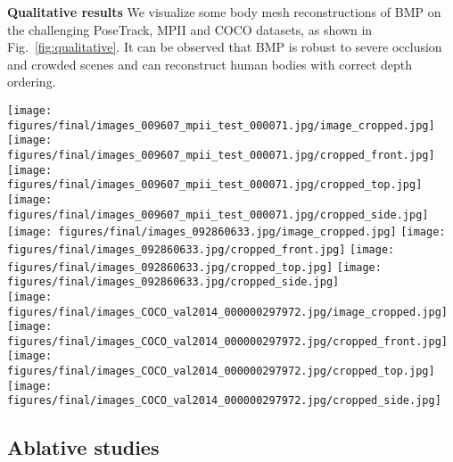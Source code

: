 \documentclass[final]{cvpr}
\newcommand{\myparagraph}[1]{{ \noindent \bf #1}}
\begin{document}
\myparagraph{Qualitative results}
We visualize some body mesh reconstructions of BMP on the challenging PoseTrack, MPII and COCO datasets, as shown in Fig.~\ref{fig:qualitative}. It can be observed that BMP is robust to severe occlusion and crowded scenes and can reconstruct human bodies with correct depth ordering.

\begin{figure*}[!ht]
	\centering
    \texttt{[image: figures/final/images\_009607\_mpii\_test\_000071.jpg/image\_cropped.jpg]}
    \texttt{[image: figures/final/images\_009607\_mpii\_test\_000071.jpg/cropped\_front.jpg]}
    \texttt{[image: figures/final/images\_009607\_mpii\_test\_000071.jpg/cropped\_top.jpg]}
    \texttt{[image: figures/final/images\_009607\_mpii\_test\_000071.jpg/cropped\_side.jpg]}
    \\
    \texttt{[image: figures/final/images\_092860633.jpg/image\_cropped.jpg]}
    \texttt{[image: figures/final/images\_092860633.jpg/cropped\_front.jpg]}
    \texttt{[image: figures/final/images\_092860633.jpg/cropped\_top.jpg]}
    \texttt{[image: figures/final/images\_092860633.jpg/cropped\_side.jpg]}
    \\
    \texttt{[image: figures/final/images\_COCO\_val2014\_000000297972.jpg/image\_cropped.jpg]}
    \texttt{[image: figures/final/images\_COCO\_val2014\_000000297972.jpg/cropped\_front.jpg]}
    \texttt{[image: figures/final/images\_COCO\_val2014\_000000297972.jpg/cropped\_top.jpg]}
    \texttt{[image: figures/final/images\_COCO\_val2014\_000000297972.jpg/cropped\_side.jpg]}
    \\
	\caption{{\bf Qualitative results.}
    We visualize the reconstructions of our approach on PoseTrack (1st row), MPII (2nd row) and COCO (3rd row) from different viewpoints: front (green background), top (blue background) and side (red background), respectively. Best viewed in color.
    Please refer to supplementary for more qualitative results.
}
\label{fig:qualitative}
\vspace{-4mm}
\end{figure*}


\subsection{Ablative studies} \label{sec:ablatives}
\end{document}
